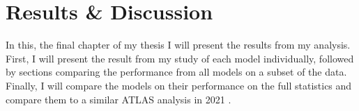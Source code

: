 \chapter{Results \& Discussion}\label{subsec:ResDisc}
In this, the final chapter of my thesis I will present the results from my analysis. First,
I will present the result from my study of each model individually, followed by sections 
comparing the performance from all models on a subset of the data. Finally, I will compare 
the models on their performance on the full statistics and compare them to a similar \ac{ATLAS} 
analysis in 2021 \cite{atlas_search_2021}.

